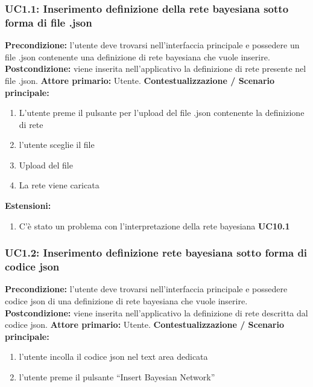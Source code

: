                 \subsubsection{UC1.1: Inserimento definizione della rete bayesiana sotto forma di file .json}
                    \textbf{Precondizione:}  l’utente deve trovarsi nell’interfaccia principale e possedere un file .json contenente una definizione di rete bayesiana che vuole inserire.
                    \newline
                    \textbf{Postcondizione:} viene inserita nell’applicativo la definizione di rete presente nel file .json.
                    \newline
                    \textbf{Attore primario:} Utente.
                    \newline
                    \textbf{Contestualizzazione / Scenario principale:} \begin{enumerate}
                        \item L’utente preme il pulsante per l’upload del file .json contenente la definizione di rete
                        \item l’utente sceglie il file
                        \item Upload del file
                        \item La rete viene caricata
                    \end{enumerate}
                    
                    \textbf{Estensioni:} \begin{enumerate}
                            \item C’è stato un problema con l’interpretazione della rete bayesiana \textbf{UC10.1}
                        \end{enumerate}
                        
                \subsubsection{UC1.2: Inserimento definizione rete bayesiana sotto forma di codice json}
                    \textbf{Precondizione:}  l’utente deve trovarsi nell’interfaccia principale e possedere codice json di una definizione di rete bayesiana che vuole inserire.
                    \newline
                    \textbf{Postcondizione:} viene inserita nell’applicativo la definizione di rete descritta dal codice json.
                    \newline
                    \textbf{Attore primario:} Utente.
                    \newline
                    \textbf{Contestualizzazione / Scenario principale:} \begin{enumerate}
                        \item l’utente incolla il codice json nel text area dedicata
                        \item l’utente preme il pulsante “Insert Bayesian Network”
                    \end{enumerate}
                    
